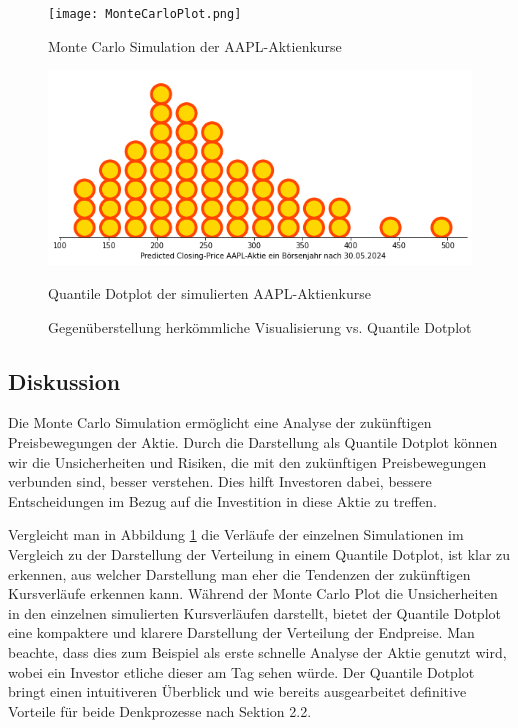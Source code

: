\begin{figure}[h!]
    \centering
    \begin{minipage}{0.48\textwidth}
        \centering
        \texttt{[image: MonteCarloPlot.png]}
        \caption{Monte Carlo Simulation der AAPL-Aktienkurse}
        \label{fig:montecarlo}
    \end{minipage}
    \hfill
    \begin{minipage}{0.48\textwidth}
        \centering
        \includegraphics[width=\textwidth]{../Bilder/AAPL_QDP.png}
        \caption{Quantile Dotplot der simulierten AAPL-Aktienkurse}
        \label{fig:quantiledotplot}
    \end{minipage}
    \caption{Gegenüberstellung herkömmliche Visualisierung vs. Quantile Dotplot}
    \label{fig:nebeneinander}
\end{figure}

\subsection{Diskussion}

Die Monte Carlo Simulation ermöglicht eine Analyse der zukünftigen Preisbewegungen der Aktie. Durch die Darstellung als Quantile Dotplot können wir die Unsicherheiten und Risiken, die mit den zukünftigen Preisbewegungen verbunden sind, besser verstehen. Dies hilft Investoren dabei, bessere Entscheidungen im Bezug auf die Investition in diese Aktie zu treffen.

Vergleicht man in Abbildung \ref{fig:nebeneinander} die Verläufe der einzelnen Simulationen im Vergleich zu der Darstellung der Verteilung in einem Quantile Dotplot, ist klar zu erkennen, aus welcher Darstellung man eher die Tendenzen der zukünftigen Kursverläufe erkennen kann. Während der Monte Carlo Plot die Unsicherheiten in den einzelnen simulierten Kursverläufen darstellt, bietet der Quantile Dotplot eine kompaktere und klarere Darstellung der Verteilung der Endpreise. Man beachte, dass dies zum Beispiel als erste schnelle Analyse der Aktie genutzt wird, wobei ein Investor etliche dieser am Tag sehen würde. Der Quantile Dotplot bringt einen intuitiveren Überblick und wie bereits ausgearbeitet definitive Vorteile für beide Denkprozesse nach Sektion 2.2.

